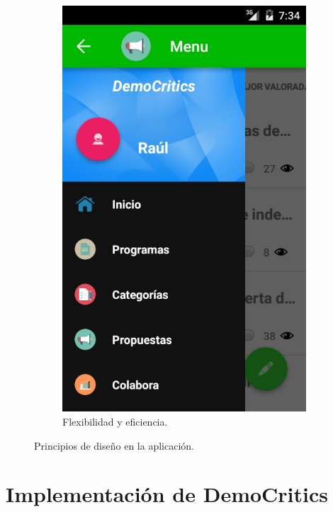 \begin{figure}[!]
\begin{subfigure}[b]{0.3\textwidth}
                \includegraphics[width=\textwidth]{Media/Captures/principio07.png}
                \caption{Flexibilidad y eficiencia.}
                \label{fig:quipComments}
        \end{subfigure}
        \caption{Principios de diseño en la aplicación.}\label{fig:quipCaptures}
	\end{figure}

\section{Implementación de DemoCritics}

